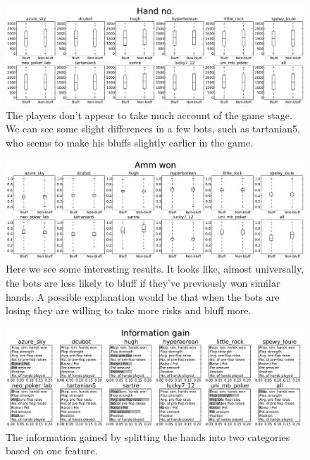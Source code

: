 \documentclass[letterpaper]{article}
\begin{document}
\clearpage

\begin{figure}[H]
    \centering
    \includegraphics[width=\textwidth,natwidth=610,natheight=642]{handVarBW.jpg}
    \caption{The players don't appear to take much account of the game stage. We can see some slight differences in a few bots, such as tartanian5, who seems to make his bluffs slightly earlier in the game.}
\end{figure}

\begin{figure}[H]
    \centering
    \includegraphics[width=\textwidth,natwidth=610,natheight=642]{histAmmWonBW.jpg}
    \caption{Here we see some interesting results. It looks like, almost universally, the bots are less likely to bluff if they've previously won similar hands. A possible explanation would be that when the bots are losing they are willing to take more risks and bluff more.}
\end{figure}

\begin{figure}[H]
    \centering
    \includegraphics[width=\textwidth,natwidth=610,natheight=642]{ig8_200BW.jpg}
    \caption{The information gained by splitting the hands into two categories based on one feature.}
\end{figure}
\twocolumn
\end{document}
